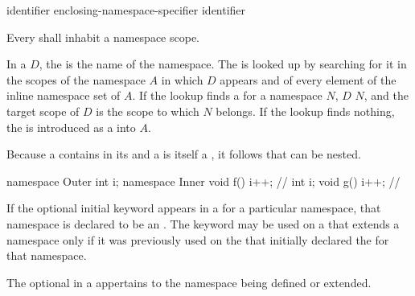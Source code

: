 \begin{bnf}
\br
        identifier\br
        enclosing-namespace-specifier \terminal{::}  identifier
\end{bnf}

\begin{bnf}
\br
\end{bnf}

\pnum
Every  shall inhabit a namespace scope.

\pnum
In a  $D$,
the  is the name of the namespace.
The  is looked up
by searching for it in the scopes of the namespace $A$
in which $D$ appears
and of every element of the inline namespace set of $A$.
If the lookup finds a  for a namespace $N$,
%
$D$  $N$,
and the target scope of $D$ is the scope to which $N$ belongs.
If the lookup finds nothing, the  is introduced
as a  into $A$.

\pnum
Because a  contains
 in its  and a
 is itself a , it
follows that  can be nested.
\begin{example}
\begin{codeblock}
namespace Outer {
  int i;
  namespace Inner {
    void f() { i++; }           // 
    int i;
    void g() { i++; }           // 
  }
}
\end{codeblock}
\end{example}

\pnum
If the optional initial  keyword appears in a
 for a particular namespace, that namespace is
declared to be an . The  keyword may be
used on a  that extends a namespace
only if it was previously used on the 
that initially declared the  for that namespace.

\pnum
The optional 
in a 
appertains to the namespace being defined or extended.

